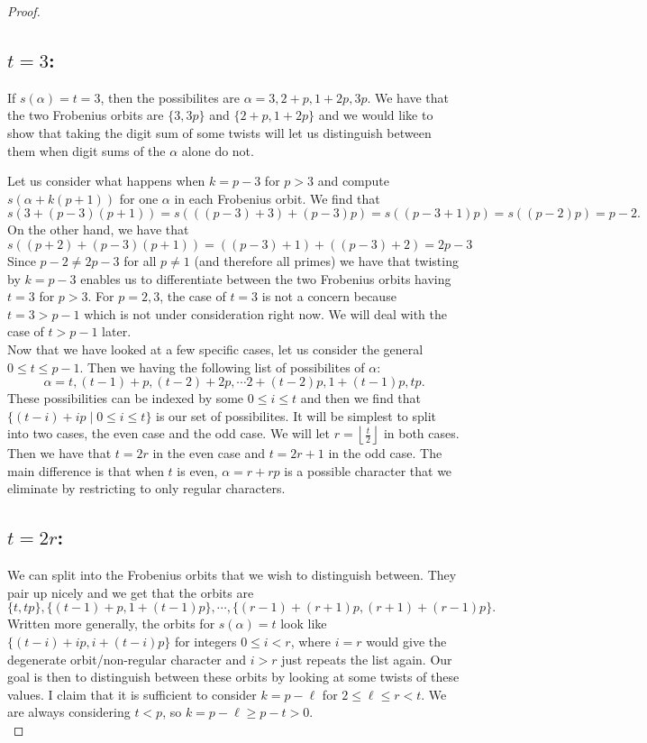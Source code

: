 \begin{proof}
\subsection{$t = 3$:} If $s(\alpha) = t= 3$, then the possibilites are $\alpha = 3,2+p,1+2p,3p$. 
We have that the two Frobenius orbits are $\{3,3p\}$ and $\{2+p, 1+2p\}$ and we would like to show that taking the digit sum of some twists will let us distinguish between them when digit sums of the $\alpha$ alone do not.

Let us consider what happens when $k = p-3$ for $p > 3$ and compute $s(\alpha + k(p+1))$ for one $\alpha$ in each Frobenius orbit. 
We find that \[s(3 + (p-3)(p+1)) = s(((p-3)+3)+(p-3)p) = s((p-3+1)p) = s((p-2)p) = p-2.\] 
On the other hand, we have that \[s((p+2)+(p-3)(p+1)) = ((p-3)+1) + ((p-3)+2) =2p-3\]
Since $p-2 \neq 2p-3$ for all $p \neq 1$ (and therefore all primes) we have that twisting by $k = p-3$ enables us to differentiate between the two Frobenius orbits having $t = 3$ for $p > 3$. 
For $p = 2,3$, the case of $t = 3$ is not a concern because $t =3 > p-1$ which is not under consideration right now. 
We will deal with the case of $t > p-1$ later.
\\

Now that we have looked at a few specific cases, let us consider the general $0 \leq t \leq p-1$. 
Then we having the following list of possibilites of $\alpha$: \[\alpha = t, (t-1) + p, (t-2) +2 p, \cdots 2 + (t-2)p , 1 + (t-1)p, tp.\] 
These possibilities can be indexed by some $0 \leq i \leq t$ and then we find that $\{ (t-i) + i p \mid 0 \leq i \leq t\}$ is our set of possibilites. 
It will be simplest to split into two cases, the even case and the odd case.
We will let $r = \left\lfloor \frac{t}{2} \right\rfloor$ in both cases.
Then we have that $t = 2r$ in the even case and $t = 2r+1$ in the odd case.
The main difference is that when $t$ is even, $\alpha = r + rp$ is a possible character that we eliminate by restricting to only regular characters.

\subsection{$t = 2r$:}
We can split into the Frobenius orbits that we wish to distinguish between. 
They pair up nicely and we get that the orbits are \[\{t, tp\}, \{(t-1)+p, 1+(t-1)p\}, \cdots, \{(r-1) + (r+1) p, (r+1) + (r-1) p\}.\] 
Written more generally, the orbits for $s(\alpha) = t$ look like $\{(t-i) + ip, i + (t-i)p\}$ for integers $0 \leq i < r $, where $i=r$ would give the degenerate orbit/non-regular character and $i > r$ just repeats the list again. 
Our goal is then to distinguish between these orbits by looking at some twists of these values.
I claim that it is sufficient to consider $k = p - \ell$ for $2 \leq \ell \leq r < t$.
We are always considering $t < p$, so $k = p - \ell \geq p - t > 0$.
\\


\end{proof}

